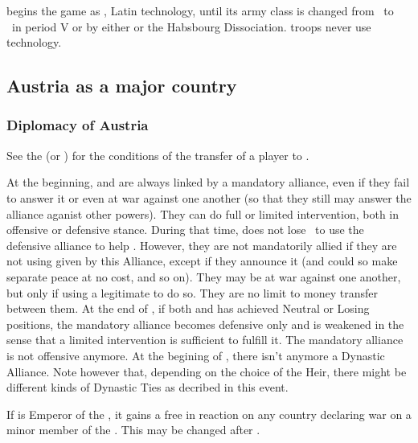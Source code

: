 \aparag[Technology]
  begins the game as \CAIII, Latin technology,
until its army class is changed from \CAIII\ to \CAIV\ in period V or by either
 or the Habsbourg Dissociation.
\bparag {} troops never use \TTER technology.

\subsection{Austria as a major country}

\subsubsection{Diplomacy of Austria}

\aparag See the  (or
) for the conditions of the
transfer of a player to \AUS.

\label{chSpecific:Habsburg Dynastic Alliance:Major}
\bparag At the beginning,  \SPA and \AUS are always linked by a
mandatory alliance, even if they fail to answer it or even at war against 
one another (so that they still may answer the alliance aganist other powers).
They can do full or limited intervention, both in offensive or defensive stance.
\bparag During that time, \SPA does not lose \STAB\ to use the defensive
alliance to help \AUS.
\bparag However, they are not mandatorily allied if they are not using
\CB given by this Alliance, except if they announce it (and could so
make separate peace at no cost, and so on).
\bparag They may be at war against one another, but only if using a
legitimate \CB to do so.
\bparag They are no limit to money transfer between them.
\bparag At the end of , if both \SPA and \AUS has
achieved Neutral or Losing positions, the mandatory alliance becomes
defensive only and is weakened in the sense that a limited intervention
is sufficient to fulfill it. The mandatory alliance is not offensive
anymore.
\bparag At the begining of  , there isn't anymore a Dynastic
Alliance. Note however that, depending on the choice of the Heir, there might
be different kinds of Dynastic Ties as decribed in this event.

\aparag[\HRE] If \AUS is Emperor of the \HRE, 
it gains a free \CB in reaction on any country declaring war on a minor 
member of the \HRE.
This may be changed after .

